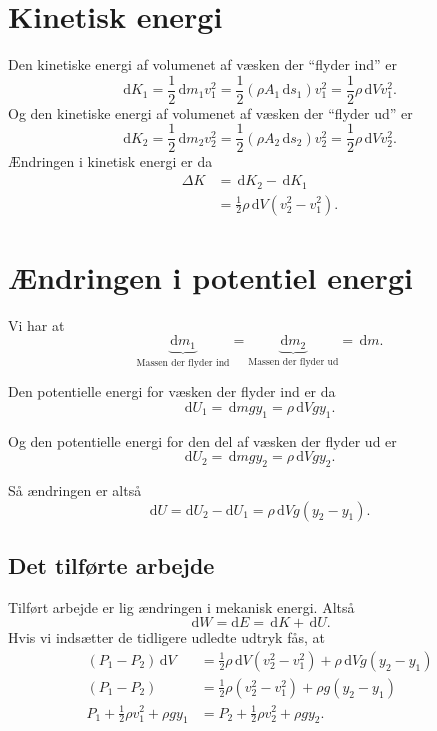\section{Kinetisk energi}
Den kinetiske energi af volumenet af væsken der ``flyder ind'' er
\[ 
\mathrm{d}K_1 = \frac{1}{2} \, \mathrm{d}m_1 v_1^2 = \frac{1}{2}(\rho A_1 \, \mathrm{d}s_1) v_1^2 = \frac{1}{2}\rho \, \mathrm{d}V v_1^2
.\]
Og den kinetiske energi af volumenet af væsken der ``flyder ud'' er
\[ 
\mathrm{d}K_2 = \frac{1}{2} \, \mathrm{d}m_2 v_2^2 = \frac{1}{2}(\rho A_2 \, \mathrm{d}s_2) v_2^2 = \frac{1}{2}\rho \, \mathrm{d}V v_2^2
.\]
Ændringen i kinetisk energi er da
\begin{align*}
  \Delta K &= \, \mathrm{d}K_2 - \, \mathrm{d}K_1 \\
  &= \frac{1}{2}\rho \, \mathrm{d}V \left( v_2^2 - v_1^2 \right)
.\end{align*}

\section{Ændringen i potentiel energi}
Vi har at
\[ 
  \underbrace{\mathrm{d}m_1}_{\text{Massen der flyder ind}} = \underbrace{\mathrm{d}m_2}_{\text{Massen der flyder ud}} = \, \mathrm{d}m
.\]

Den potentielle energi for væsken der flyder ind er da
\[ 
  \mathrm{d}U_1 = \, \mathrm{d}m g y_1 = \rho \, \mathrm{d}V g y_1
.\]

Og den potentielle energi for den del af væsken der flyder ud er
\[ 
    \mathrm{d}U_2 = \, \mathrm{d}m g y_2 = \rho \, \mathrm{d}V g y_2
.\]

Så ændringen er altså
\[ 
  \mathrm{d}U = \mathrm{d}U_2 - \mathrm{d}U_1 = \rho \, \mathrm{d}V g (y_2 - y_1)
.\]

\subsection{Det tilførte arbejde}
Tilført arbejde er lig ændringen i mekanisk energi. Altså
\[ 
  \, \mathrm{d}W = \mathrm{d}E = \, \mathrm{d}K + \, \mathrm{d}U
.\]
Hvis vi indsætter de tidligere udledte udtryk fås, at
\begin{align*}
  (P_1 - P_2) \, \mathrm{d}V & = \frac{1}{2}\rho \, \mathrm{d}V \left( v_2^2 - v_1^2 \right) + \rho \, \mathrm{d}V g(y_2 - y_1)  \\
  (P_1 - P_2) &= \frac{1}{2}\rho \left( v_2^2 - v_1^2 \right) + \rho g (y_2 - y_1)  \\
  P_1 + \frac{1}{2}\rho v_1^2 + \rho g y_1 &= P_2 + \frac{1}{2}\rho v_2^2 + \rho g y_2
.\end{align*}

